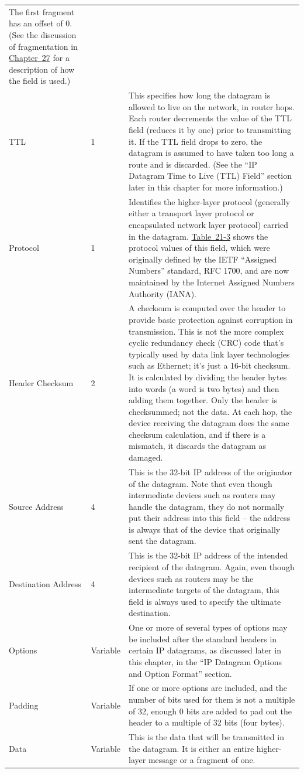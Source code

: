 \begin{longtable}[]{@{}lll@{}}
The first fragment has an offset of 0. (See the discussion of
fragmentation in \protect\hyperlink{ch27.html}{Chapter~27} for a
description of how the field is used.)\tabularnewline
TTL & 1 & This specifies how long the datagram is allowed to live on the
network, in router hops. Each router decrements the value of the TTL
field (reduces it by one) prior to transmitting it. If the TTL field
drops to zero, the datagram is assumed to have taken too long a route
and is discarded. (See the ``IP Datagram Time to Live (TTL) Field''
section later in this chapter for more information.)\tabularnewline
Protocol & 1 & Identifies the higher-layer protocol (generally either a
transport layer protocol or encapsulated network layer protocol) carried
in the datagram.
\protect\hyperlink{ch21s02.htmlux5cux23ipv_protocol_subfields}{Table~21-3}
shows the protocol values of this field, which were originally defined
by the IETF ``Assigned Numbers'' standard, RFC 1700, and are now
maintained by the Internet Assigned Numbers Authority
(IANA).\tabularnewline
Header Checksum & 2 & A checksum is computed over the header to provide
basic protection against corruption in transmission. This is not the
more complex cyclic redundancy check (CRC) code that's typically used by
data link layer technologies such as Ethernet; it's just a 16-bit
checksum. It is calculated by dividing the header bytes into words (a
word is two bytes) and then adding them together. Only the header is
checksummed; not the data. At each hop, the device receiving the
datagram does the same checksum calculation, and if there is a mismatch,
it discards the datagram as damaged.\tabularnewline
Source Address & 4 & This is the 32-bit IP address of the originator of
the datagram. Note that even though intermediate devices such as routers
may handle the datagram, they do not normally put their address into
this field -- the address is always that of the device that originally
sent the datagram.\tabularnewline
Destination Address & 4 & This is the 32-bit IP address of the intended
recipient of the datagram. Again, even though devices such as routers
may be the intermediate targets of the datagram, this field is always
used to specify the ultimate destination.\tabularnewline
Options & Variable & One or more of several types of options may be
included after the standard headers in certain IP datagrams, as
discussed later in this chapter, in the ``IP Datagram Options and Option
Format'' section.\tabularnewline
Padding & Variable & If one or more options are included, and the number
of bits used for them is not a multiple of 32, enough 0 bits are added
to pad out the header to a multiple of 32 bits (four
bytes).\tabularnewline
Data & Variable & This is the data that will be transmitted in the
datagram. It is either an entire higher-layer message or a fragment of
one.\tabularnewline
\bottomrule
\end{longtable}


